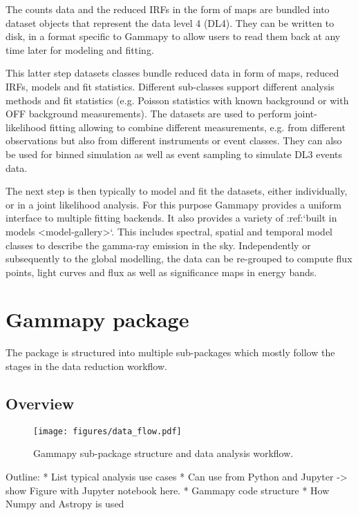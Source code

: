 The counts data and the reduced IRFs in the form of maps are bundled into dataset objects
that represent the data level 4 (DL4). They can be written to
disk, in a format specific to Gammapy to allow users to read them back at any time later
for modeling and fitting.

This latter step 
 datasets classes bundle reduced data in form of maps, reduced IRFs, models and
fit statistics. Different sub-classes support different analysis methods
and fit statistics (e.g. Poisson statistics with known background or
with OFF background measurements). The datasets are used to perform joint-likelihood
fitting allowing to combine different measurements, e.g. from different observations
but also from different instruments or event classes. They can also be used for binned
simulation as well as event sampling to simulate DL3 events data.

The next step is then typically to model and fit the datasets, either
individually, or in a joint likelihood analysis. For this purpose Gammapy
provides a uniform interface to multiple fitting backends. It also provides
a variety of :ref:`built in models <model-gallery>`. This includes spectral,
spatial and temporal model classes to describe the gamma-ray emission in the sky.
Independently or subsequently to the global modelling, the data can be
re-grouped to compute flux points, light curves and flux as well as significance
maps in energy bands.

\section{Gammapy package}
\label{sec:gammapy-package}

The \gammapy package is structured into multiple sub-packages which mostly
follow the stages in the data reduction workflow.

\subsection{Overview}
\label{ssec:overview}
\begin{figure*}[t]
	\centering
	\texttt{[image: figures/data\_flow.pdf]}
	\caption{
		Gammapy sub-package structure and data analysis workflow. }
	\label{fig:data_flow} \end{figure*}

Outline: * List typical analysis use cases * Can use from Python and Jupyter ->
show Figure with Jupyter notebook here. * Gammapy code structure * How Numpy
and Astropy is used

